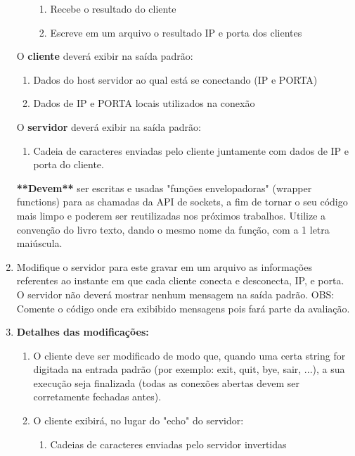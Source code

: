 \documentclass[12pt,a4paper]{report}
\begin{document}
\begin{enumerate}
\begin{enumerate}
        \begin{enumerate}
            \item Recebe o resultado do cliente
            \item Escreve em um arquivo o resultado IP e porta dos clientes
        \end{enumerate}
    \end{enumerate}
    O \textbf{cliente} deverá exibir na saída padrão:
    \begin{enumerate}
        \item Dados do host servidor ao qual está se conectando (IP e PORTA)
        \item Dados de IP e PORTA locais utilizados na conexão
    \end{enumerate}
    O \textbf{servidor} deverá exibir na saída padrão:
    \begin{enumerate}
        \item Cadeia de caracteres enviadas pelo cliente juntamente com dados de IP e porta
do cliente.
    \end{enumerate}
    \textbf{**Devem**} ser escritas e usadas "funções envelopadoras" (wrapper functions) para as chamadas da API de sockets, a fim de tornar o seu código mais limpo e poderem ser reutilizadas nos próximos trabalhos. Utilize a convenção do livro texto, dando o mesmo nome da função, com a 1\textordfeminine{} letra maiúscula.

    \item Modifique o servidor para este gravar em um arquivo as informações referentes ao instante em que cada cliente conecta e desconecta, IP, e porta. O servidor não deverá mostrar nenhum mensagem na saída padrão. OBS: Comente o código onde era exibibido mensagens pois fará parte da avaliação.
    
    \item \textbf{Detalhes das modificações:}
    \begin{enumerate}
        \item O cliente deve ser modificado de modo que, quando uma certa string for digitada na entrada padrão (por exemplo: exit, quit, bye, sair, ...), a sua execução seja finalizada (todas as conexões abertas devem ser corretamente fechadas antes).
        
        \item O cliente exibirá, no lugar do "echo" do servidor:
        \begin{enumerate}
            \item Cadeias de caracteres enviadas pelo servidor invertidas
        \end{enumerate}
        

\end{enumerate}
\end{enumerate}
\end{document}
